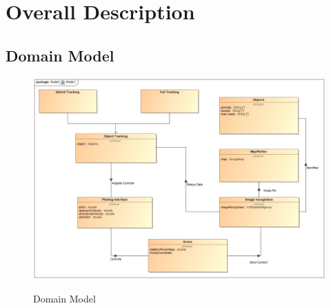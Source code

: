 \chapter{Overall Description}

\section{Domain Model}
\begin{figure}[h!]
	\includegraphics[width=\linewidth]{./assets/images/Model.jpg}
	\label{fig: Domain Model}
	\caption{Domain Model}
\end{figure}



